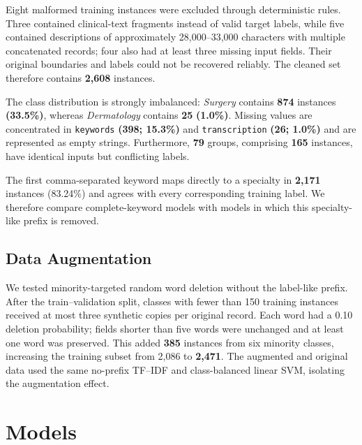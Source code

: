 \documentclass[twocolumn,10pt]{article}
\begin{document}
Eight malformed training instances were excluded through deterministic rules. Three contained clinical-text fragments instead of valid target labels, while five contained descriptions of approximately 28,000--33,000 characters with multiple concatenated records; four also had at least three missing input fields. Their original boundaries and labels could not be recovered reliably. The cleaned set therefore contains \textbf{2,608} instances.

The class distribution is strongly imbalanced: \textit{Surgery} contains \textbf{874} instances \textbf{(33.5\%)}, whereas \textit{Dermatology} contains \textbf{25} \textbf{(1.0\%)}. Missing values are concentrated in \texttt{keywords} \textbf{(398; 15.3\%)} and \texttt{transcription} \textbf{(26; 1.0\%)} and are represented as empty strings. Furthermore, \textbf{79} groups, comprising \textbf{165} instances, have identical inputs but conflicting labels.

The first comma-separated keyword maps directly to a specialty in \textbf{2,171} instances (83.24\%) and agrees with every corresponding training label. We therefore compare complete-keyword models with models in which this specialty-like prefix is removed.
\vspace{-0.3cm}

\subsection*{\vspace{-0.2cm}Data Augmentation}

We tested minority-targeted random word deletion without the label-like prefix. After the train--validation split, classes with fewer than 150 training instances received at most three synthetic copies per original record. Each word had a 0.10 deletion probability; fields shorter than five words were unchanged and at least one word was preserved. This added \textbf{385} instances from six minority classes, increasing the training subset from 2,086 to \textbf{2,471}. The augmented and original data used the same no-prefix TF--IDF and class-balanced linear SVM, isolating the augmentation effect.
\vspace{-0.54cm}

\section*{\vspace{-0.35cm}Models}
\end{document}
